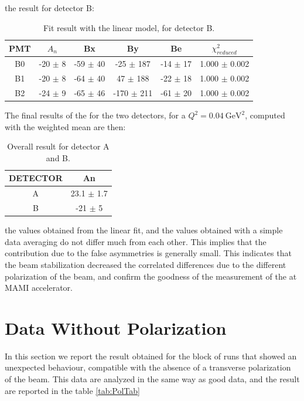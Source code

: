 the result for detector B: 

\begin{table}[hbtp]
\centering
\begin{tabular}{c|c|c|c|c|c}
\hline
 PMT   & $A_{n}$         & Bx         & By           & Be        & $\chi^{2}_{reduced}$\\
\hline
 B0    & -20 $\pm$ 8 & -59 $\pm$ 40 & -25 $\pm$ 187  & -14 $\pm$ 17  & 1.000 $\pm$ 0.002 \\
 B1    & -20 $\pm$ 8  & -64 $\pm$ 40 & 47 $\pm$ 188    & -22 $\pm$ 18 & 1.000 $\pm$ 0.002 \\
 B2    & -24 $\pm$ 9 & -65 $\pm$ 46 & -170 $\pm$ 211 & -61 $\pm$ 20 & 1.000 $\pm$ 0.002 \\
\hline
\end{tabular}
\caption{Fit result with the linear model, for detector B.}
\end{table}

The final results of the \transv for the two detectors, for a $Q^{2} = \SI{0.04}{\giga \electronvolt \squared}$, computed with the weighted mean are then:

\begin{table}[h]
\centering
\begin{tabular}{c|c}
\hline
 DETECTOR   & An    \\
\hline
 A          & 23.1 $\pm$ 1.7  \\
 B          & -21 $\pm$ 5   \\
\hline
\end{tabular}
\caption{Overall result for detector A and B.}
\label{tab:RisultatiBellissimiFinali}
\end{table}

the values obtained from the linear fit, and the values obtained with a simple data averaging do not differ much from each other. This implies that the contribution due to the false asymmetries is generally small. This indicates that the beam stabilization decreased the correlated differences due to the different polarization of the beam, and confirm the goodness of the measurement of the \transv at MAMI accelerator.  

\section{Data Without Polarization}

In this section we report the result obtained for the block of runs that showed an unexpected behaviour, compatible with the absence of a transverse polarization of the beam. This data are analyzed in the same way as good data, and the result are reported in the table \ref{tab:PolTab} 

